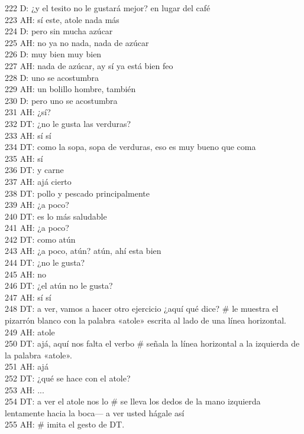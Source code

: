 222 D: ¿y el tesito no le gustará mejor? en lugar del café\\
223 AH: sí este, atole nada más\\
224 D: pero sin mucha azúcar\\
225 AH: no ya no nada, nada de azúcar\\
226 D: muy bien muy bien\\
227 AH: nada de azúcar, ay sí ya está bien feo\\
228 D: uno se acostumbra\\
229 AH: un bolillo hombre, también\\
230 D: pero uno se acostumbra\\
231 AH: ¿sí?\\
232 DT: ¿no le gusta las verduras?\\
233 AH: sí sí\\
234 DT: como la sopa, sopa de verduras, eso es muy bueno que coma\\
235 AH: sí\\
236 DT: y carne\\
237 AH: ajá cierto\\
238 DT: pollo y pescado principalmente\\
239 AH: ¿a poco?\\
240 DT: es lo más saludable\\
241 AH: ¿a poco?\\
242 DT: como atún\\
243 AH: ¿a poco, atún? atún, ahí esta bien\\
244 DT: ¿no le gusta?\\
245 AH: no\\
246 DT: ¿el atún no le gusta?\\
247 AH: sí sí\\
248 DT: a ver, vamos a hacer otro ejercicio ¿aquí qué dice? \# le muestra el pizarrón blanco con la palabra «atole» escrita al lado de una línea horizontal.\\
249 AH: atole\\
250 DT: ajá, aquí nos falta el verbo \# señala la línea horizontal a la izquierda de la palabra «atole».\\
251 AH: ajá\\
252 DT: ¿qué se hace con el atole?\\
253 AH: ...\\
254 DT: a ver el atole nos lo \# se lleva los dedos de la mano izquierda lentamente hacia la boca--- a ver usted hágale así\\
255 AH: \# imita el gesto de DT.\\
